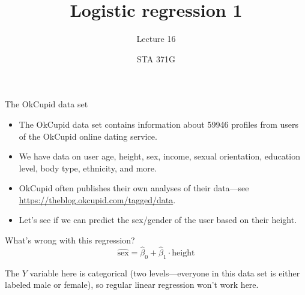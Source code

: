 \documentclass{beamer}\usepackage[]{graphicx}\usepackage[]{color}
\title{Logistic regression 1}
\subtitle{Lecture 16}
\author{STA 371G}
\begin{document}
  
  

  \frame{\maketitle}



  \begin{darkframes}
    \begin{frame}
    \end{frame}

    \begin{frame}{The OkCupid data set}
      \begin{itemize}
        \item The OkCupid data set contains information about 59946 profiles from users of the OkCupid online dating service.
        \item We have data on user age, height, sex, income, sexual orientation, education level, body type, ethnicity, and more.
        \item OkCupid often publishes their own analyses of their data---see \url{https://theblog.okcupid.com/tagged/data}.
        \item Let's see if we can predict the sex/gender of the user based on their height.
      \end{itemize}
    \end{frame}

    \begin{frame}{What's wrong with this regression?}
      \[
        \widehat{\text{sex}} = \hat\beta_0 + \hat\beta_1\cdot\text{height}
      \]

      \pause

      \begin{center}
        The $Y$ variable here is \alert{categorical} (two levels---everyone in this data set is either labeled male or female), so regular linear regression won't work here.
      \end{center}
    \end{frame}


\end{darkframes}
\end{document}
